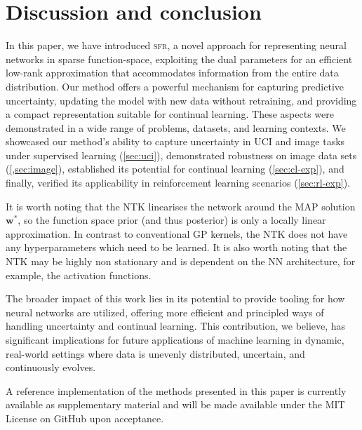 \documentclass{article}
\newcommand{\our}{\textsc{sfr}\xspace}
\newcommand{\weights}{\ensuremath{\mathbf{w}}}
\begin{document}
\section{Discussion and conclusion}
\label{sec:conclusion}
%
In this paper, we have introduced \our, a novel approach for representing neural networks in sparse function-space, exploiting the dual parameters for an efficient low-rank approximation that accommodates information from the entire data distribution. Our method offers a powerful mechanism for capturing predictive uncertainty, updating the model with new data without retraining, and providing a compact representation suitable for continual learning. These aspects were demonstrated in a wide range of problems, datasets, and learning contexts. We showcased our method's ability to capture uncertainty in UCI and image tasks under supervised learning (\cref{sec:uci}), demonstrated robustness on image data sets (\cref{,sec:image}), established its potential for continual learning (\cref{sec:cl-exp}), and finally, verified its applicability in reinforcement learning scenarios (\cref{sec:rl-exp}).

It is worth noting that the NTK linearises the network around the MAP solution $\weights^{*}$,
so the function space prior (and thus posterior) is only a locally linear approximation.
In contrast to conventional GP kernels, the NTK does not have any hyperparameters which need to be learned.
It is also worth noting that the NTK may be highly non stationary and is dependent on the NN architecture, for example, the activation functions.




The broader impact of this work lies in its potential to provide tooling for how neural networks are utilized, offering more efficient and principled ways of handling uncertainty and continual learning. This contribution, we believe, has significant implications for future applications of machine learning in dynamic, real-world settings where data is unevenly distributed, uncertain, and continuously evolves.

A reference implementation of the methods presented in this paper is currently available as supplementary material and will be made available under the MIT License on GitHub upon acceptance.


\end{document}
